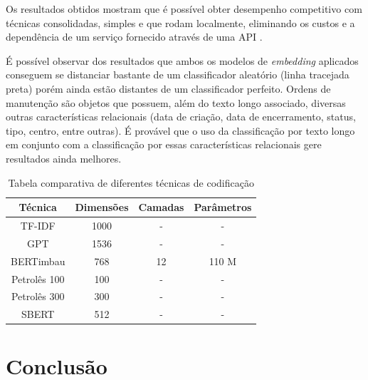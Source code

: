 \documentclass[conference]{IEEEtran}
\begin{document}
  Os resultados obtidos mostram que é possível obter desempenho competitivo com técnicas consolidadas, simples e que rodam localmente, eliminando os custos e a dependência de um serviço fornecido através de uma API \cite{neelakantan2022text}.

    É possível observar dos resultados que ambos os modelos de \textit{embedding} aplicados conseguem se distanciar bastante de um classificador aleatório (linha tracejada preta) porém ainda estão distantes de um classificador perfeito. Ordens de manutenção são objetos que possuem, além do texto longo associado, diversas outras características relacionais (data de criação, data de encerramento, status, tipo, centro, entre outras). É provável que o uso da classificação por texto longo em conjunto com a classificação por essas características relacionais gere resultados ainda melhores.
    
\begin{table}
    \centering
    \caption{Tabela comparativa de diferentes técnicas de codificação}
    \label{tab:my_label}
    \def\arraystretch{1.2}
    \begin{tabular}{cccc} 
        \hline
        Técnica & Dimensões & Camadas & Parâmetros \\ 
        \hline
        TF-IDF & 1000 & -& -\\ 
        \hline
        GPT & 1536 & -& -\\ 
        \hline
        BERTimbau & 768 & 12 & 110 M \\ 
        \hline
        Petrolês 100 & 100 & -& -\\ 
        \hline
        Petrolês 300 & 300 & -& -\\ 
        \hline
        SBERT & 512 & -& -\\ 
        \hline
    \end{tabular}
\end{table}
  
\section{Conclusão}
\end{document}
